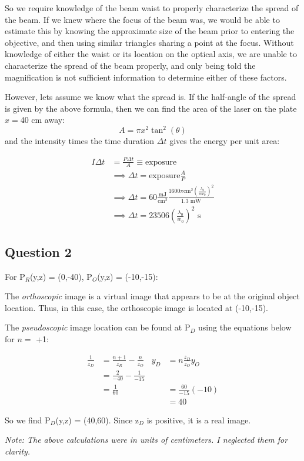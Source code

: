 \documentclass[12pt]{article}
\begin{document}
So we require knowledge of the beam waist to properly characterize the spread of the beam.  If we knew where the focus of the beam was, we would be able to estimate this by knowing the approximate size of the beam prior to entering the objective, and then using similar triangles sharing a point at the focus.  Without knowledge of either the waist or its location on the optical axis, we are unable to characterize the spread of the beam properly, and only being told the magnification is not sufficient information to determine either of these factors.

However, lets assume we know what the spread is.  If the half-angle of the spread is given by the above formula, then we can find the area of the laser on the plate $x= $40 cm away:
$$
A = \pi x^2\tan^2(\theta)
$$
and the intensity times the time duration $\Delta t$ gives the energy per unit area:

\begin{align*}
	I \Delta t &= \frac{P \Delta t}{A} \equiv \text{exposure}\\
	&\implies \Delta t = \text{exposure} \frac{A}{P}\\
	&\implies \Delta t = 60 \frac{\text{mJ}}{\text{cm}^2} \frac{ 1600 \pi \text{cm}^2 \left(\frac{\lambda_0}{\pi w_0}\right)^2}{1.3 \text{ mW}}\\
	&\implies \Delta t = 23506 \left(\frac{\lambda_0}{w_0}\right)^2\text{ s}
\end{align*}

\subsection{Question 2}

For P$_R$(y,z) = (0,-40), P$_O$(y,z) = (-10,-15):

The \emph{orthoscopic} image is a virtual image that appears to be at the original object location.  Thus, in this case, the orthoscopic image is located at (-10,-15).

The \emph{pseudoscopic} image location can be found at P$_D$ using the equations below for $n =$ +1:

\begin{align*}
	\frac{1}{z_D} &= \frac{n+1}{z_R} - \frac{n}{z_O} &y_D &= n\frac{z_D}{z_O}y_O\\
	&= \frac{2}{-40} - \frac{1}{-15} & &\\
	&= \frac{1}{60} & &=\frac{60}{-15}(-10)\\
	& & &=40
\end{align*}

So we find P$_D$(y,z) = (40,60).  Since z$_D$ is positive, it is a real image.

\emph{Note: The above calculations were in units of centimeters.  I neglected them for clarity.}
\end{document}
